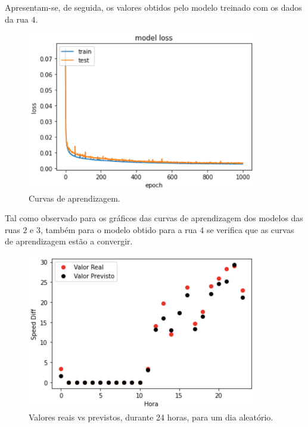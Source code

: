 \documentclass[a4paper, 12pt]{article}
\begin{document}
Apresentam-se, de seguida, os valores obtidos pelo modelo treinado com os dados da rua $4$. 

\begin{figure}[H]
	\centering
	\includegraphics[width=10cm]{resultados/curvas_aprend_4.png}
	\caption{Curvas de aprendizagem.}
\end{figure}

Tal como observado para os gráficos das curvas de aprendizagem dos modelos das ruas $2$ e $3$, também para o modelo obtido para a rua $4$ se verifica que as curvas de aprendizagem estão a convergir.

\begin{figure}[H]
	\centering
	\includegraphics[width=10cm]{resultados/real_prev_4.png}
	\caption{Valores reais vs previstos, durante 24 horas, para um dia aleatório.}
\end{figure}
\end{document}
